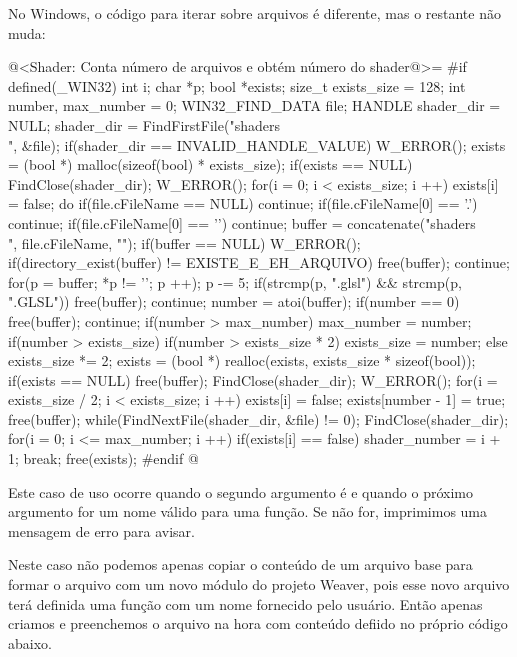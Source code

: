 {No Windows, o código para iterar sobre arquivos é diferente, mas o
restante não muda:

\iniciocodigo
@<Shader: Conta número de arquivos e obtém número do shader@>=
#if defined(_WIN32)
{
  int i;
  char *p;
  bool *exists;
  size_t exists_size = 128;
  int number, max_number = 0;
  WIN32_FIND_DATA file;
  HANDLE shader_dir = NULL;
  shader_dir = FindFirstFile("shaders\\", &file);
  if(shader_dir == INVALID_HANDLE_VALUE)
    W_ERROR();
  exists = (bool *) malloc(sizeof(bool) * exists_size);
  if(exists == NULL){
    FindClose(shader_dir);
    W_ERROR();
  }
  for(i = 0; i < exists_size; i ++)
    exists[i] = false;
  do{
    if(file.cFileName == NULL) continue;
    if(file.cFileName[0] == '.') continue;
    if(file.cFileName[0] == '\0') continue;
    buffer = concatenate("shaders\\", file.cFileName, "");
    if(buffer == NULL) W_ERROR();
    if(directory_exist(buffer) != EXISTE_E_EH_ARQUIVO){
      free(buffer);
      continue;
    }
    for(p = buffer; *p != '\0'; p ++);
    p -= 5;
    if(strcmp(p, ".glsl") && strcmp(p, ".GLSL")){
      free(buffer);
      continue;
    }
    number = atoi(buffer);
    if(number == 0){
      free(buffer);
      continue;
    }
    if(number > max_number)
      max_number = number;
    if(number > exists_size){
      if(number > exists_size * 2)
        exists_size = number;
      else
        exists_size *= 2;
      exists = (bool *) realloc(exists, exists_size * sizeof(bool));
      if(exists == NULL){
        free(buffer);
        FindClose(shader_dir);
        W_ERROR();
      }
      for(i = exists_size / 2; i < exists_size; i ++)
        exists[i] = false;
    }
    exists[number - 1] = true;
    free(buffer);
  }while(FindNextFile(shader_dir, &file) != 0);
  FindClose(shader_dir);
  for(i = 0; i <= max_number; i ++)
  if(exists[i] == false){
    shader_number = i + 1;
    break;
  }
  free(exists);
}
#endif
@
\fimcodigo


Este caso de uso ocorre quando o segundo argumento é
 e quando o próximo argumento for um nome válido
para uma função. Se não for, imprimimos uma mensagem de erro para
avisar.

Neste caso não podemos apenas copiar o conteúdo de um arquivo base
para formar o arquivo com um novo módulo do projeto Weaver, pois esse
novo arquivo terá definida uma função com um nome fornecido pelo
usuário. Então apenas criamos e preenchemos o arquivo na hora com
conteúdo defiido no próprio código abaixo.

}
